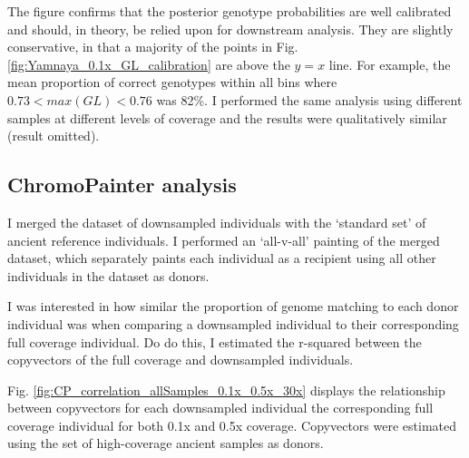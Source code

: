 The figure confirms that the posterior genotype probabilities are well calibrated and should, in theory, be relied upon for downstream analysis. They are slightly conservative, in that a majority of the points in Fig. \ref{fig:Yamnaya_0.1x_GL_calibration} are above the $y=x$ line. For example, the mean proportion of correct genotypes within all bins where $0.73 < max(GL) < 0.76$ was 82\%. I performed the same analysis using different samples at different levels of coverage and the results were qualitatively similar (result omitted).

\subsection{ChromoPainter analysis}

I merged the dataset of downsampled individuals with the `standard set' of ancient reference individuals. I performed an `all-v-all' painting of the merged dataset, which separately paints each individual as a recipient using all other individuals in the dataset as donors.

I was interested in how similar the proportion of genome matching to each donor individual was when comparing a downsampled individual to their corresponding full coverage individual. Do do this, I estimated the r-squared between the copyvectors of the full coverage and downsampled individuals.

Fig. \ref{fig:CP_correlation_allSamples_0.1x_0.5x_30x} displays the relationship between copyvectors for each downsampled individual the corresponding full coverage individual for both 0.1x and 0.5x coverage. Copyvectors were estimated using the set of high-coverage ancient samples as donors.

